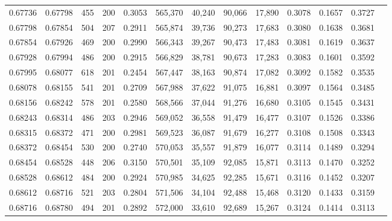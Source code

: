 \begin{tabular}{rrrrrrrrrrrrr}
0.67736 & 0.67798 &   455 & 200 &                                     0.3053 & 565,370 &  40,240 &  90,066 &  17,890 & 0.3078 & 0.1657 & 0.3727 \\
0.67798 & 0.67854 &   504 & 207 &                                     0.2911 & 565,874 &  39,736 &  90,273 &  17,683 & 0.3080 & 0.1638 & 0.3681 \\
0.67854 & 0.67926 &   469 & 200 &                                     0.2990 & 566,343 &  39,267 &  90,473 &  17,483 & 0.3081 & 0.1619 & 0.3637 \\
0.67928 & 0.67994 &   486 & 200 &                                     0.2915 & 566,829 &  38,781 &  90,673 &  17,283 & 0.3083 & 0.1601 & 0.3592 \\
0.67995 & 0.68077 &   618 & 201 &                                     0.2454 & 567,447 &  38,163 &  90,874 &  17,082 & 0.3092 & 0.1582 & 0.3535 \\
0.68078 & 0.68155 &   541 & 201 &                                     0.2709 & 567,988 &  37,622 &  91,075 &  16,881 & 0.3097 & 0.1564 & 0.3485 \\
0.68156 & 0.68242 &   578 & 201 &                                     0.2580 & 568,566 &  37,044 &  91,276 &  16,680 & 0.3105 & 0.1545 & 0.3431 \\
0.68243 & 0.68314 &   486 & 203 &                                     0.2946 & 569,052 &  36,558 &  91,479 &  16,477 & 0.3107 & 0.1526 & 0.3386 \\
0.68315 & 0.68372 &   471 & 200 &                                     0.2981 & 569,523 &  36,087 &  91,679 &  16,277 & 0.3108 & 0.1508 & 0.3343 \\
0.68372 & 0.68454 &   530 & 200 &                                     0.2740 & 570,053 &  35,557 &  91,879 &  16,077 & 0.3114 & 0.1489 & 0.3294 \\
0.68454 & 0.68528 &   448 & 206 &                                     0.3150 & 570,501 &  35,109 &  92,085 &  15,871 & 0.3113 & 0.1470 & 0.3252 \\
0.68528 & 0.68612 &   484 & 200 &                                     0.2924 & 570,985 &  34,625 &  92,285 &  15,671 & 0.3116 & 0.1452 & 0.3207 \\
0.68612 & 0.68716 &   521 & 203 &                                     0.2804 & 571,506 &  34,104 &  92,488 &  15,468 & 0.3120 & 0.1433 & 0.3159 \\
0.68716 & 0.68780 &   494 & 201 &                                     0.2892 & 572,000 &  33,610 &  92,689 &  15,267 & 0.3124 & 0.1414 & 0.3113 \\

\end{tabular}
